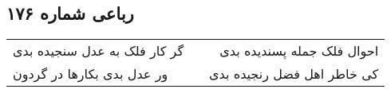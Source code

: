 \begin{center}
\section*{رباعی شماره ۱۷۶}
\label{sec:sh176}
\begin{longtable}{l p{0.5cm} r}
گر کار فلک به عدل سنجیده بدی
&&
احوال فلک جمله پسندیده بدی
\\
ور عدل بدی بکارها در گردون
&&
کی خاطر اهل فضل رنجیده بدی
\\
\end{longtable}
\end{center}

